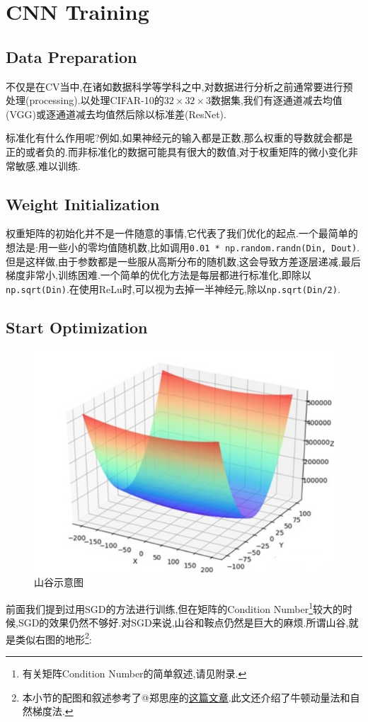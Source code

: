 \section{CNN Training}
\subsection{Data Preparation}
不仅是在CV当中,在诸如数据科学等学科之中,对数据进行分析之前通常要进行预处理(processing).以处理CIFAR-10的$32\times32\times3$数据集,我们有逐通道减去均值(VGG)或逐通道减去均值然后除以标准差(ResNet).

标准化有什么作用呢?例如,如果神经元的输入都是正数,那么权重的导数就会都是正的或者负的.而非标准化的数据可能具有很大的数值,对于权重矩阵的微小变化非常敏感,难以训练.
\subsection{Weight Initialization}
权重矩阵的初始化并不是一件随意的事情,它代表了我们优化的起点.一个最简单的想法是:用一些小的零均值随机数,比如调用\texttt{0.01 * np.random.randn(Din, Dout)}.但是这样做,由于参数都是一些服从高斯分布的随机数,这会导致方差逐层递减,最后梯度非常小,训练困难.一个简单的优化方法是每层都进行标准化,即除以\texttt{np.sqrt(Din)}.在使用ReLu时,可以视为去掉一半神经元,除以\texttt{np.sqrt(Din/2)}.


\subsection{Start Optimization}
\begin{figure}
	\includegraphics[scale=0.55]{figures/valley.png}
	\caption{山谷示意图}
	\label{valley}
\end{figure}
前面我们提到过用SGD的方法进行训练,但在矩阵的Condition Number\footnote{有关矩阵Condition Number的简单叙述,请见附录.}较大的时候,SGD的效果仍然不够好.对SGD来说,山谷和鞍点仍然是巨大的麻烦.所谓山谷,就是类似右图的地形\footnote{本小节的配图和叙述参考了@郑思座的\href{https://zhuanlan.zhihu.com/p/60088231}{这篇文章}.此文还介绍了牛顿动量法和自然梯度法.}:

